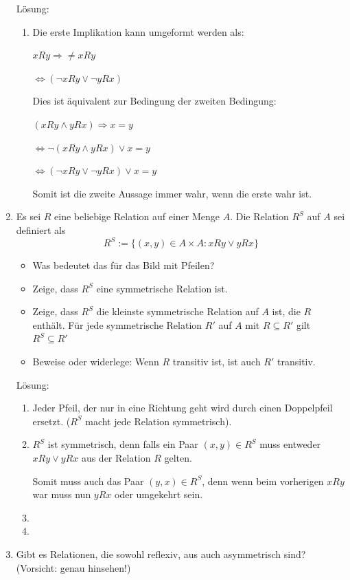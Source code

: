 \documentclass[main.tex]{subfiles}
\begin{document}
\begin{enumerate}
	      Lösung:
	      \begin{enumerate}
		      \item  Die erste Implikation kann umgeformt werden als:

		            \( xRy \Rightarrow \neq xRy \)

		            \( \Leftrightarrow (\neg xRy \lor \neg yRx) \)


		            Dies ist äquivalent zur Bedingung der zweiten Bedingung:

		            \( (xRy \land yRx) \Rightarrow x = y \)

		            \( \Leftrightarrow \neg(xRy \land yRx) \lor x = y \)

		            \( \Leftrightarrow (\neg xRy \lor \neg yRx) \lor x = y \)

		            Somit ist die zweite Aussage immer wahr, wenn die erste wahr ist.
	      \end{enumerate}
	\item Es sei \( R \) eine beliebige Relation auf einer Menge \( A \).
	      Die Relation \( R^S \) auf \( A \) sei definiert als
	      \[ R^S := \{ (x,y) \in A \times A : xRy \lor yRx \} \]
	      \begin{itemize}
		      \item Was bedeutet das für das Bild mit Pfeilen?
		      \item Zeige, dass \( R^S \) eine symmetrische Relation ist.
		      \item Zeige, dass \( R^S \) die kleinste symmetrische Relation auf \( A \) ist,
		            die \( R \) enthält.
		            Für jede symmetrische Relation \( R' \) auf \( A \) mit \( R \subseteq R' \)  gilt
		            \( R^S \subseteq R' \)
		      \item Beweise oder widerlege: Wenn \( R \) transitiv ist, ist auch \( R' \) transitiv.
	      \end{itemize}

	      Lösung:
	      \begin{enumerate}
		      \item Jeder Pfeil, der nur in eine Richtung geht wird durch einen Doppelpfeil ersetzt.
		            (\( R^S \) macht jede Relation symmetrisch).
		      \item \( R^S \) ist symmetrisch, denn falls ein Paar \( (x,y) \in R^S \) muss entweder
		            \( xRy \lor yRx \) aus der Relation \( R \) gelten.

		            Somit muss auch das Paar \( (y,x) \in R^S \),
		            denn wenn beim vorherigen \( xRy \) war muss nun \( yRx \) oder umgekehrt sein.
		      \item
		      \item
	      \end{enumerate}
	\item Gibt es Relationen, die sowohl reflexiv, aus auch asymmetrisch sind?
	      (Vorsicht: genau hinsehen!)


\end{enumerate}
\end{document}
